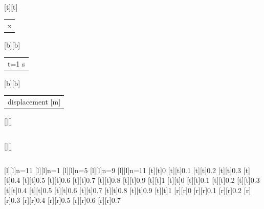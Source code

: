 %    
%
%
\begin{psfrags}%
\psfragscanon%
%
[t][t]{\color[rgb]{0,0,0}\setlength{\tabcolsep}{0pt}\begin{tabular}{c}{x}\end{tabular}}%
[b][b]{\color[rgb]{0,0,0}\setlength{\tabcolsep}{0pt}\begin{tabular}{c}t=1 s\end{tabular}}%
[b][b]{\color[rgb]{0,0,0}\setlength{\tabcolsep}{0pt}\begin{tabular}{c}displacement [m]\end{tabular}}%
[][]{\color[rgb]{0,0,0}\setlength{\tabcolsep}{0pt}\begin{tabular}{c} \end{tabular}}%
[][]{\color[rgb]{0,0,0}\setlength{\tabcolsep}{0pt}\begin{tabular}{c} \end{tabular}}%
[l][l]{\color[rgb]{0,0,0}n=11}%
[l][l]{\color[rgb]{0,0,0}n=1}%
[l][l]{\color[rgb]{0,0,0}n=5}%
[l][l]{\color[rgb]{0,0,0}n=9}%
[l][l]{\color[rgb]{0,0,0}n=11}%
%
[t][t]{0}%
[t][t]{0.1}%
[t][t]{0.2}%
[t][t]{0.3}%
[t][t]{0.4}%
[t][t]{0.5}%
[t][t]{0.6}%
[t][t]{0.7}%
[t][t]{0.8}%
[t][t]{0.9}%
[t][t]{1}%
[t][t]{0}%
[t][t]{0.1}%
[t][t]{0.2}%
[t][t]{0.3}%
[t][t]{0.4}%
[t][t]{0.5}%
[t][t]{0.6}%
[t][t]{0.7}%
[t][t]{0.8}%
[t][t]{0.9}%
[t][t]{1}%
%
[r][r]{0}%
[r][r]{0.1}%
[r][r]{0.2}%
[r][r]{0.3}%
[r][r]{0.4}%
[r][r]{0.5}%
[r][r]{0.6}%
[r][r]{0.7}%

\end{psfrags}

